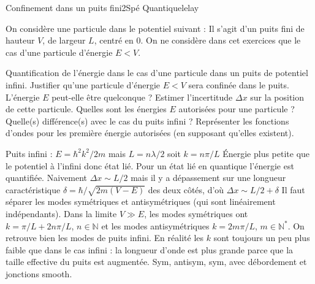 \begin{exercise}{Confinement dans un puits fini}{2}{Spé}
{Quantique}{lelay}

On considère une particule dans le potentiel suivant : Il s'agit d'un puits fini de hauteur $V$, de largeur $L$, centré en 0. On ne considère dans cet exercices que le cas d'une particule d'énergie $E < V$.

\begin{center}
\end{center}

\begin{questions}
    \questioncours Quantification de l'énergie dans le cas d'une particule dans un puits de potentiel infini.
    \question Justifier qu'une particule d'énergie $E< V$ sera confinée dans le puits. L'énergie $E$ peut-elle être quelconque ?
    \question Estimer l'incertitude $\Delta x$ sur la position de cette particule.
    \question Quelles sont les énergies $E$ autorisées pour une particule ? Quelle(s) différence(s) avec le cas du puits infini ?
    \question Représenter les fonctions d'ondes pour les première énergie autorisées (en supposant qu'elles existent).
\end{questions}

\end{exercise}

\begin{solution}

\begin{questions}
    \questioncours Puits infini : $E = \hbar^2k^2/2m$ mais $L = n \lambda/2$ soit $k = n \pi/L$
    \question Énergie plus petite que le potentiel à l'infini donc état lié. Pour un état lié en quantique l'énergie est quantifiée.
    \question Naivement $\Delta x \sim L/2$ mais il y a dépassement sur une longueur caractéristique $\delta = \hbar/\sqrt{2m(V-E)}$ des deux côtés, d'où $\Delta x \sim L/2 + \delta$
    \question Il faut séparer les modes symétriques et antisymétriques (qui sont linéairement indépendants). Dans la limite $V \gg E$, les modes symétriques ont $k = \pi/L + 2n\pi/L$, $n\in \mathbb{N}$ et les modes antisymétriques $k = 2m\pi/L$, $m\in \mathbb{N}^*$. On retrouve bien les modes de puits infini. En réalité les $k$ sont toujours un peu plus faible que dans le cas infini : la longueur d'onde est plus grande parce que la taille effective du puits est augmentée.
    \question Sym, antisym, sym, avec débordement et jonctions smooth.
\end{questions}
\end{solution}